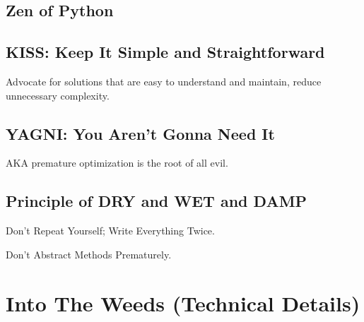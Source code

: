 \subsection{Zen of Python}
\begin{definition}
\end{definition}

\subsection{KISS: Keep It Simple and Straightforward}
\begin{notes}
    Advocate for solutions that are easy to understand and maintain, reduce unnecessary complexity.
\end{notes}

\subsection{YAGNI: You Aren't Gonna Need It}
\begin{notes}
    AKA premature optimization is the root of all evil. 
\end{notes}

\subsection{Principle of DRY and WET and DAMP}
\begin{notes}
    Don't Repeat Yourself; Write Everything Twice.
    \vspace{1em}

    Don't Abstract Methods Prematurely.
\end{notes}
\newpage

\section{Into The Weeds (Technical Details)}

